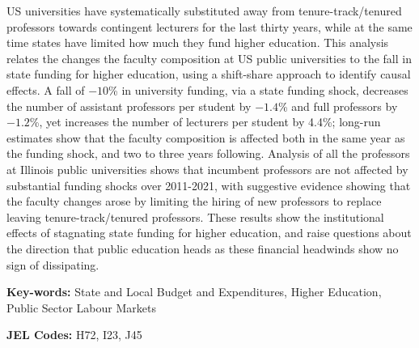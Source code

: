 US universities have systematically substituted away from tenure-track/tenured professors towards contingent lecturers for the last thirty years, while at the same time states have limited how much they fund higher education.
This analysis relates the changes the faculty composition at US public universities to the fall in state funding for higher education, using a shift-share approach to identify causal effects.
A fall of $-10$\% in university funding, via a state funding shock, decreases the number of assistant professors per student by $-1.4$\% and full professors by $-1.2$\%, yet increases the number of lecturers per student by 4.4\%; long-run estimates show that the faculty composition is affected both in the same year as the funding shock, and two to three years following.
Analysis of all the professors at Illinois public universities shows that incumbent professors are not affected by substantial funding shocks over 2011-2021, with suggestive evidence showing that the faculty changes arose by limiting the hiring of new professors to replace leaving tenure-track/tenured professors.
These results show the institutional effects of stagnating state funding for higher education, and raise questions about the direction that public education heads as these financial headwinds show no sign of dissipating.

\vfill
\noindent
\textbf{Key-words:}
State and Local Budget and Expenditures,
Higher Education,
Public Sector Labour Markets

\vspace{0.1cm}
\noindent
\textbf{JEL Codes:} H72, I23, J45
